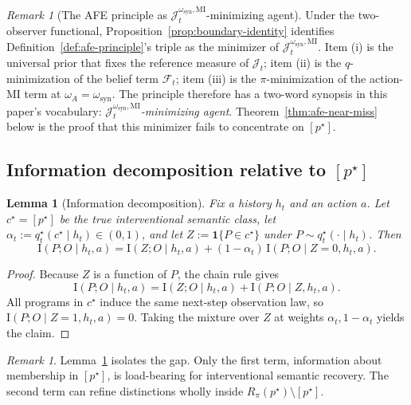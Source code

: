 \documentclass[11pt]{article}
\newtheorem{lemma}[theorem]{Lemma}
\theoremstyle{definition}
\theoremstyle{remark}
\newtheorem{remark}[theorem]{Remark}
\newcommand{\Fcal}{\mathcal{F}}
\newcommand{\I}{\mathrm{I}}
\newcommand{\one}{\mathbf{1}}
\begin{document}
\begin{remark}[The AFE principle as $\mathcal J_t^{\omega_{\mathrm{syn}},\mathrm{MI}}$-minimizing agent]
\label{rem:afe-as-functional-minimizer}
Under the two-observer functional, Proposition~\ref{prop:boundary-identity} identifies Definition~\ref{def:afe-principle}'s triple as the minimizer of $\mathcal J_t^{\omega_{\mathrm{syn}},\mathrm{MI}}$. Item (i) is the universal prior that fixes the reference measure of $\mathcal J_t$; item (ii) is the $q$-minimization of the belief term $\Fcal_t$; item (iii) is the $\pi$-minimization of the action-MI term at $\omega_A=\omega_{\mathrm{syn}}$. The principle therefore has a two-word synopsis in this paper's vocabulary: \emph{$\mathcal J_t^{\omega_{\mathrm{syn}},\mathrm{MI}}$-minimizing agent}. Theorem~\ref{thm:afe-near-miss} below is the proof that this minimizer fails to concentrate on $[p^\star]$.
\end{remark}

\subsection{Information decomposition relative to $[p^\star]$}

\begin{lemma}[Information decomposition]
\label{lem:info-decomp}
Fix a history $h_t$ and an action $a$. Let $c^\star=[p^\star]$ be the true interventional semantic class, let $\alpha_t:=q_t^\star(c^\star\mid h_t)\in(0,1)$, and let $Z:=\one\{P\in c^\star\}$ under $P\sim q_t^\star(\cdot\mid h_t)$. Then
\[
\I(P;O\mid h_t,a)
=
\I(Z;O\mid h_t,a)+(1-\alpha_t)\,\I(P;O\mid Z=0,h_t,a).
\]
\end{lemma}

\begin{proof}
Because $Z$ is a function of $P$, the chain rule gives
\[
\I(P;O\mid h_t,a)=\I(Z;O\mid h_t,a)+\I(P;O\mid Z,h_t,a).
\]
All programs in $c^\star$ induce the same next-step observation law, so $\I(P;O\mid Z=1,h_t,a)=0$. Taking the mixture over $Z$ at weights $\alpha_t,1-\alpha_t$ yields the claim.
\end{proof}

\begin{remark}
Lemma~\ref{lem:info-decomp} isolates the gap. Only the first term, information about membership in $[p^\star]$, is load-bearing for interventional semantic recovery. The second term can refine distinctions wholly inside $R_\pi(p^\star)\setminus[p^\star]$.
\end{remark}
\end{document}
